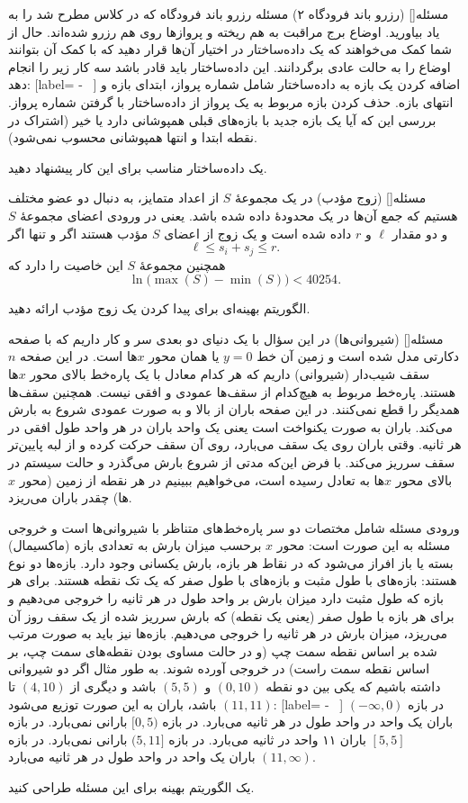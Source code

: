‌مسئله[]
(رزرو باند فرودگاه ۲)
مسئله رزرو باند فرودگاه که در کلاس مطرح شد را به یاد بیاورید. اوضاع برج مراقبت به هم ریخته و پروازها روی هم رزرو شده‌اند. حال از شما کمک می‌خواهند که یک داده‌ساختار در اختیار آن‌ها قرار دهید که با کمک آن بتوانند اوضاع را به حالت عادی برگردانند. این داده‌ساختار باید قادر باشد سه کار زیر را انجام دهد:
[label= - \ ]
اضافه کردن یک بازه به داده‌ساختار شامل شماره پرواز، ابتدای بازه و انتهای بازه.
حذف کردن بازه مربوط به یک پرواز از داده‌ساختار با گرفتن شماره پرواز.
بررسی این که آیا یک بازه جدید با بازه‌های قبلی همپوشانی دارد یا خیر (اشتراک در نقطه ابتدا و انتها همپوشانی محسوب نمی‌شود).

یک داده‌ساختار مناسب برای این کار پیشنهاد دهید.

‌مسئله[]
(زوج مؤدب)
در یک مجموعۀ $S$ از اعداد متمایز، به دنبال دو عضو مختلف هستیم که جمع آن‌ها در یک محدودۀ داده شده باشد. یعنی در ورودی اعضای مجموعۀ $S$ و دو مقدار $\ell$ و $r$ داده شده است و یک زوج از اعضای $S$ مؤدب هستند اگر و تنها اگر
$$\ell \leq s_i + s_j \leq r.$$
همچنین مجموعۀ $S$ این خاصیت را دارد که
$$\ln\Big(\max(S) - \min(S)\Big) < 40254.$$

الگوریتم بهینه‌ای برای پیدا کردن یک زوج مؤدب ارائه دهید.

‌مسئله[]
(شیروانی‌ها)
در این سؤال با یک دنیای دو بعدی سر و کار داریم که با صفحه دکارتی مدل شده است و زمین آن خط $y=0$ یا همان محور $x$ها است. در این صفحه $n$ سقف شیب‌دار (شیروانی) داریم که هر کدام معادل با یک پاره‌خط بالای محور $x$ها هستند. پاره‌خط مربوط به هیچ‌کدام از سقف‌ها عمودی و افقی نیست. همچنین سقف‌ها همدیگر را قطع نمی‌کنند. در این صفحه باران از بالا و به صورت عمودی شروع به بارش می‌کند. باران به صورت یکنواخت است یعنی یک واحد باران در هر واحد طول افقی در هر ثانیه. وقتی باران روی یک سقف می‌بارد، روی آن سقف حرکت کرده و از لبه پایین‌تر سقف سرریز می‌کند. با فرض این‌که مدتی از شروع بارش می‌گذرد و حالت سیستم در بالای محور $x$ها به تعادل رسیده است، می‌خواهیم ببینیم در هر نقطه از زمین (محور $x$ها) چقدر باران می‌ریزد.

ورودی مسئله شامل مختصات دو سر پاره‌خط‌های متناظر با شیروانی‌ها است و خروجی مسئله به این صورت است: محور $x$ برحسب میزان بارش به تعدادی بازه (ماکسیمال) بسته یا باز افراز می‌شود که در نقاط هر بازه، بارش یکسانی وجود دارد. بازه‌ها دو نوع هستند: بازه‌های با طول مثبت و بازه‌های با طول صفر که یک تک نقطه هستند. برای هر بازه که طول مثبت دارد میزان بارش بر واحد طول در هر ثانیه را خروجی می‌دهیم و برای هر بازه با طول صفر (یعنی یک نقطه) که بارش سرریز شده از یک سقف روز آن می‌ریز‌د، میزان بارش در هر ثانیه را خروجی می‌دهیم. بازه‌ها نیز باید به صورت مرتب شده بر اساس نقطه سمت چپ (و در حالت مساوی بودن نقطه‌های سمت چپ، بر اساس نقطه سمت راست) در خروجی آورده شوند. به طور مثال اگر دو شیروانی داشته باشیم که یکی بین دو نقطه $(0,10)$ و $(5,5)$ باشد و دیگری از $(4,10)$ تا $(11,11)$ باشد، باران به این صورت توزیع می‌شود:
[label= - \ ]
در بازه $(-\infty,0)$ باران یک واحد در واحد طول در هر ثانیه می‌بارد.
در بازه $[0, 5)$ بارانی نمی‌بارد.
در بازه $[5, 5]$ باران ۱۱ واحد در ثانیه می‌بارد.
در بازه $(5, 11]$ بارانی نمی‌بارد.
در بازه $(11, \infty)$ باران یک واحد در واحد طول در هر ثانیه می‌بارد.


 یک الگوریتم بهینه برای این مسئله طراحی کنید.

